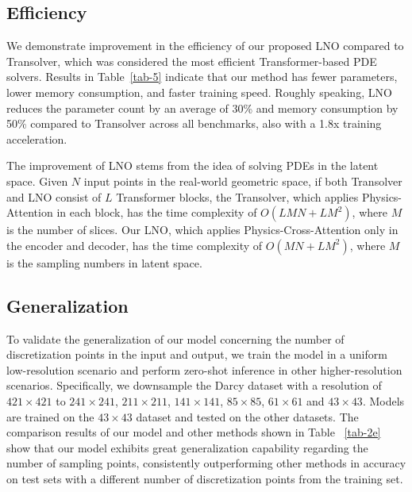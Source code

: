 \documentclass{article}
\begin{document}
\subsection{Efficiency}
\label{Efficiency}
We demonstrate improvement in the efficiency of our proposed LNO compared to Transolver, which was considered the most efficient Transformer-based PDE solvers\cite{Transolver}. Results in Table~\ref{tab-5} indicate that our method has fewer parameters, lower memory consumption, and faster training speed. Roughly speaking, LNO reduces the parameter count by an average of 30\% and memory consumption by 50\% compared to Transolver across all benchmarks, also with a 1.8x training acceleration. 

The improvement of LNO stems from the idea of solving PDEs in the latent space. Given $N$ input points in the real-world geometric space, if both Transolver and LNO consist of $L$ Transformer blocks, the Transolver, which applies Physics-Attention in each block, has the time complexity of $O(LMN+LM^2)$, where $M$ is the number of slices. Our LNO, which applies Physics-Cross-Attention only in the encoder and decoder, has the time complexity of $O(MN+LM^2)$, where $M$ is the sampling numbers in latent space.

\subsection{Generalization}
\label{Generalization}
To validate the generalization of our model concerning the number of discretization points in the input and output, we train the model in a uniform low-resolution scenario and perform zero-shot inference in other higher-resolution scenarios. Specifically, we downsample the Darcy dataset with a resolution of $421\times421$ to $241\times241$, $211\times211$, $141\times141$, $85\times85$, $61\times61$ and $43\times43$. Models are trained on the $43\times43$ dataset and tested on the other datasets. The comparison results of our model and other methods shown in Table ~\ref{tab-2e} show that our model exhibits great generalization capability regarding the number of sampling points, consistently outperforming other methods in accuracy on test sets with a different number of discretization points from the training set.
\end{document}
